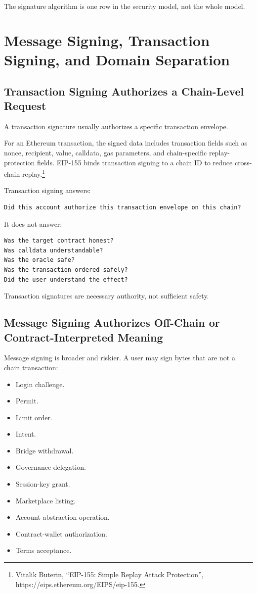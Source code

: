The signature algorithm is one row in the security model, not the whole
model.

\section{Message Signing, Transaction Signing, and Domain Separation}

\subsection{Transaction Signing Authorizes a Chain-Level Request}

A transaction signature usually authorizes a specific transaction
envelope.

For an Ethereum transaction, the signed data includes transaction fields
such as nonce, recipient, value, calldata, gas parameters, and
chain-specific replay-protection fields. EIP-155 binds transaction
signing to a chain ID to reduce cross-chain replay.\footnote{Vitalik
  Buterin, ``EIP-155: Simple Replay Attack Protection'',
  https://eips.ethereum.org/EIPS/eip-155.}

Transaction signing answers:

\begin{lstlisting}
Did this account authorize this transaction envelope on this chain?
\end{lstlisting}

It does not answer:

\begin{lstlisting}
Was the target contract honest?
Was calldata understandable?
Was the oracle safe?
Was the transaction ordered safely?
Did the user understand the effect?
\end{lstlisting}

Transaction signatures are necessary authority, not sufficient safety.

\subsection{Message Signing Authorizes Off-Chain or Contract-Interpreted
Meaning}

Message signing is broader and riskier. A user may sign bytes that are
not a chain transaction:

\begin{itemize}
\tightlist
\item
  Login challenge.
\item
  Permit.
\item
  Limit order.
\item
  Intent.
\item
  Bridge withdrawal.
\item
  Governance delegation.
\item
  Session-key grant.
\item
  Marketplace listing.
\item
  Account-abstraction operation.
\item
  Contract-wallet authorization.
\item
  Terms acceptance.
\end{itemize}

